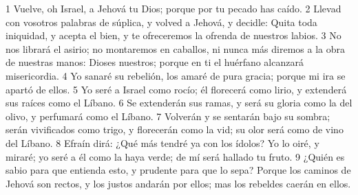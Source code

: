 1 Vuelve, oh Israel, a Jehová tu Dios; porque por tu pecado has caído.
2 Llevad con vosotros palabras de súplica, y volved a Jehová, y decidle: Quita toda iniquidad, y acepta el bien, y te ofreceremos la ofrenda de nuestros labios.
3 No nos librará el asirio; no montaremos en caballos, ni nunca más diremos a la obra de nuestras manos: Dioses nuestros; porque en ti el huérfano alcanzará misericordia.
4 Yo sanaré su rebelión, los amaré de pura gracia; porque mi ira se apartó de ellos.
5 Yo seré a Israel como rocío; él florecerá como lirio, y extenderá sus raíces como el Líbano.
6 Se extenderán sus ramas, y será su gloria como la del olivo, y perfumará como el Líbano.
7 Volverán y se sentarán bajo su sombra; serán vivificados como trigo, y florecerán como la vid; su olor será como de vino del Líbano.
8 Efraín dirá: ¿Qué más tendré ya con los ídolos? Yo lo oiré, y miraré; yo seré a él como la haya verde; de mí será hallado tu fruto.
9 ¿Quién es sabio para que entienda esto, y prudente para que lo sepa? Porque los caminos de Jehová son rectos, y los justos andarán por ellos; mas los rebeldes caerán en ellos.

